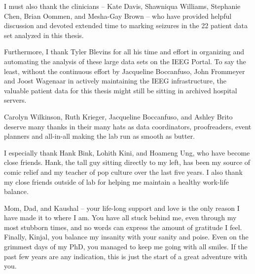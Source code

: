 \begin{acknowledgements}
I must also thank the clinicians -- Kate Davis, Shawniqua Williams, Stephanie Chen, Brian Oommen, and Mesha-Gay Brown -- who have provided helpful discussion and devoted extended time to marking seizures in the 22 patient data set analyzed in this thesis.

Furthermore, I thank Tyler Blevins for all his time and effort in organizing and automating the analysis of these large data sets on the IEEG Portal. To say the least, without the continuous effort by Jacqueline Boccanfuso, John Frommeyer and Joost Wagenaar in actively maintaining the IEEG infrastructure, the valuable patient data for this thesis might still be sitting in archived hospital servers.

Carolyn Wilkinson, Ruth Krieger, Jacqueline Boccanfuso, and Ashley Brito deserve many thanks in their many hats as data coordinators, proofreaders, event planners and all-in-all making the lab run as smooth as butter.

I especially thank Hank Bink, Lohith Kini, and Hoameng Ung, who have become close friends. Hank, the tall guy sitting directly to my left, has been my source of comic relief and my teacher of pop culture over the last five years. I also thank my close friends outside of lab for helping me maintain a healthy work-life balance.

Mom, Dad, and Kaushal -- your life-long support and love is the only reason I have made it to where I am. You have all stuck behind me, even through my most stubborn times, and no words can express the amount of gratitude I feel. Finally, Kinjal, you balance my insanity with your sanity and poise. Even on the grimmest days of my PhD, you managed to keep me going with all smiles. If the past few years are any indication, this is just the start of a great adventure with you.

\end{acknowledgements}



